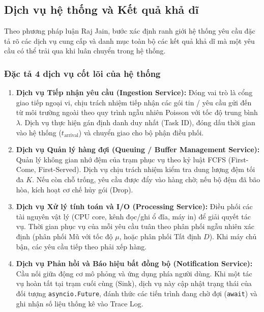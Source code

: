 \subsection{Dịch vụ hệ thống và Kết quả khả dĩ}
\label{subsec:dich-vu-ket-qua}

\hspace{0.5cm}Theo phương pháp luận Raj Jain, bước xác định ranh giới hệ thống yêu cầu đặc tả rõ các dịch vụ cung cấp và danh mục toàn bộ các kết quả khả dĩ mà một yêu cầu có thể trải qua khi luân chuyển trong hệ thống.

\subsubsection{Đặc tả 4 dịch vụ cốt lõi của hệ thống}

\begin{enumerate}[leftmargin=1.5em]
    \item \textbf{Dịch vụ Tiếp nhận yêu cầu (Ingestion Service):} Đóng vai trò là cổng giao tiếp ngoại vi, chịu trách nhiệm tiếp nhận các gói tin / yêu cầu gửi đến từ môi trường ngoài theo quy trình ngẫu nhiên Poisson với tốc độ trung bình $\lambda$. Dịch vụ thực hiện gán định danh duy nhất (Task ID), đóng dấu thời gian vào hệ thống ($t_{\text{arrival}}$) và chuyển giao cho bộ phận điều phối.
    \item \textbf{Dịch vụ Quản lý hàng đợi (Queuing / Buffer Management Service):} Quản lý không gian nhớ đệm của trạm phục vụ theo kỷ luật FCFS (First-Come, First-Served). Dịch vụ chịu trách nhiệm kiểm tra dung lượng đệm tối đa $K$. Nếu còn chỗ trống, yêu cầu được đẩy vào hàng chờ; nếu bộ đệm đã bão hòa, kích hoạt cơ chế hủy gói (Drop).
    \item \textbf{Dịch vụ Xử lý tính toán và I/O (Processing Service):} Điều phối các tài nguyên vật lý (CPU core, kênh đọc/ghi ổ đĩa, máy in) để giải quyết tác vụ. Thời gian phục vụ của mỗi yêu cầu tuân theo phân phối ngẫu nhiên xác định (phân phối Mũ với tốc độ $\mu$, hoặc phân phối Tất định $D$). Khi máy chủ bận, các yêu cầu tiếp theo phải xếp hàng.
    \item \textbf{Dịch vụ Phản hồi và Báo hiệu bất đồng bộ (Notification Service):} Cầu nối giữa động cơ mô phỏng và ứng dụng phía người dùng. Khi một tác vụ hoàn tất tại trạm cuối cùng (Sink), dịch vụ này cập nhật trạng thái của đối tượng \texttt{asyncio.Future}, đánh thức các tiến trình đang chờ đợi (\texttt{await}) và ghi nhận số liệu thống kê vào Trace Log.
\end{enumerate}

